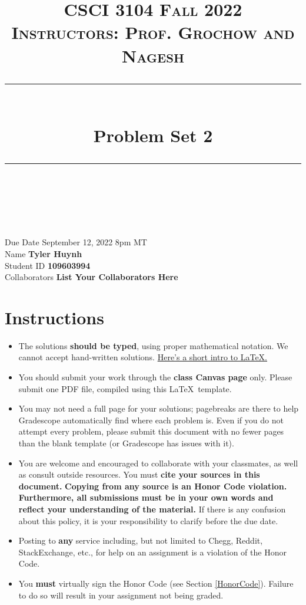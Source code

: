 \documentclass[11pt]{article}
\title{
\normalfont \normalsize 
\textsc{CSCI 3104 Fall 2022 \\ 
Instructors: Prof. Grochow and Nagesh} \\
[10pt] 
\rule{\linewidth}{0.5pt} \\[6pt] 
\huge Problem Set 2 \\
\rule{\linewidth}{2pt}  \\[10pt]
}
\date{}
\theoremstyle{definition}
\theoremstyle{definition}
\theoremstyle{definition}
\begin{document}

\maketitle


\noindent
Due Date \dotfill September 12, 2022 8pm MT\\
Name \dotfill \textbf{Tyler Huynh} \\
Student ID \dotfill \textbf{109603994} \\
Collaborators \dotfill \textbf{List Your Collaborators Here}

\tableofcontents

\section*{Instructions}

 \begin{itemize}
	\item The solutions \textbf{should be typed}, using proper mathematical notation. We cannot accept hand-written solutions. \href{http://ece.uprm.edu/~caceros/latex/introduction.pdf}{Here's a short intro to \LaTeX.}
	\item You should submit your work through the \textbf{class Canvas page} only. Please submit one PDF file, compiled using this \LaTeX \ template.
	\item You may not need a full page for your solutions; pagebreaks are there to help Gradescope automatically find where each problem is. Even if you do not attempt every problem, please submit this document with no fewer pages than the blank template (or Gradescope has issues with it).

	\item You are welcome and encouraged to collaborate with your classmates, as well as consult outside resources. You must \textbf{cite your sources in this document.} \textbf{Copying from any source is an Honor Code violation. Furthermore, all submissions must be in your own words and reflect your understanding of the material.} If there is any confusion about this policy, it is your responsibility to clarify before the due date. 

	\item Posting to \textbf{any} service including, but not limited to Chegg, Reddit, StackExchange, etc., for help on an assignment is a violation of the Honor Code.

	\item You \textbf{must} virtually sign the Honor Code (see Section \ref{HonorCode}). Failure to do so will result in your assignment not being graded.
\end{itemize}
\end{document}
